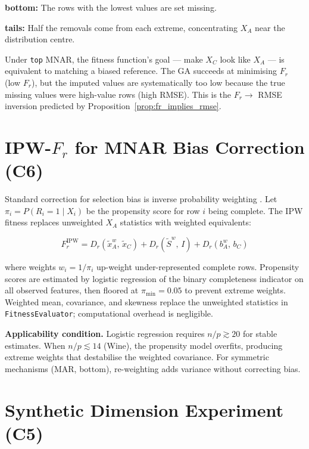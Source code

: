\textbf{bottom:} The rows with the lowest values are set missing.

\textbf{tails:} Half the removals come from each extreme, concentrating $X_A$ near the distribution centre.

Under \texttt{top} MNAR, the fitness function's goal --- make $X_C$ look like $X_A$ --- is equivalent to matching a biased reference. The GA succeeds at minimising $F_r$ (low $F_r$), but the imputed values are systematically too low because the true missing values were high-value rows (high RMSE). This is the $F_r \to$ RMSE inversion predicted by Proposition~\ref{prop:fr_implies_rmse}.

\section{IPW-\texorpdfstring{$F_r$}{Fr} for MNAR Bias Correction (C6)}
\label{sec:ipw_implementation}

Standard correction for selection bias is inverse probability weighting \cite{HorvitzThompson1952}. Let $\pi_i = P(R_i = 1 \mid X_i)$ be the propensity score for row $i$ being complete. The IPW fitness replaces unweighted $X_A$ statistics with weighted equivalents:

\begin{equation}
    F_r^{\text{IPW}} = D_r\!\left(\tilde{x}_A^w,\, \tilde{x}_C\right) + D_r\!\left(\tilde{S}^w,\, I\right) + D_r\!\left(b_A^w,\, b_C\right)
\end{equation}

where weights $w_i = 1/\pi_i$ up-weight under-represented complete rows. Propensity scores are estimated by logistic regression of the binary completeness indicator on all observed features, then floored at $\pi_{\min} = 0.05$ to prevent extreme weights. Weighted mean, covariance, and skewness replace the unweighted statistics in \texttt{FitnessEvaluator}; computational overhead is negligible.

\textbf{Applicability condition.} Logistic regression requires $n/p \gtrsim 20$ for stable estimates. When $n/p \lesssim 14$ (Wine), the propensity model overfits, producing extreme weights that destabilise the weighted covariance. For symmetric mechanisms (MAR, bottom), re-weighting adds variance without correcting bias.

\section{Synthetic Dimension Experiment (C5)}
\label{sec:synthetic_dim_methods}

